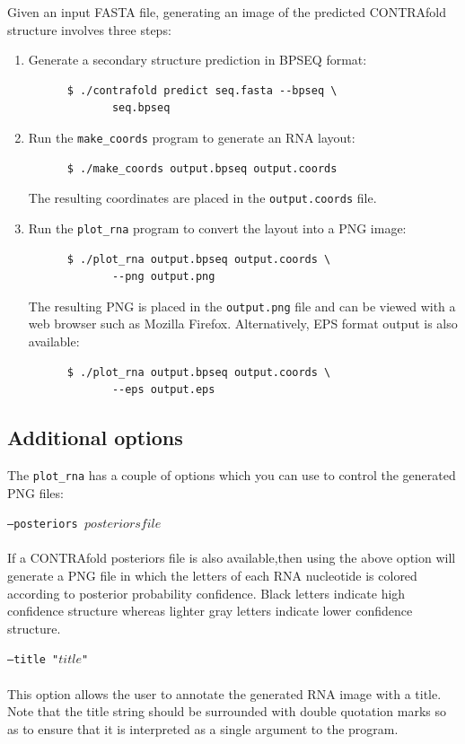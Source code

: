 \documentclass{article}
\begin{document}
  Given an input FASTA file, generating an image of the predicted
  CONTRAfold structure involves three steps:
  \begin{enumerate}
  \item 
    Generate a secondary structure prediction in BPSEQ format:
    \begin{verbatim}
      $ ./contrafold predict seq.fasta --bpseq \
             seq.bpseq\end{verbatim}
  \item
    Run the \texttt{make\_coords} program to generate an RNA layout:
    \begin{verbatim}
      $ ./make_coords output.bpseq output.coords\end{verbatim}
    The resulting coordinates are placed in the \texttt{output.coords}
    file.  
  \item
    Run the \texttt{plot\_rna} program to convert the 
    layout into a PNG image:
    \begin{verbatim}
      $ ./plot_rna output.bpseq output.coords \
             --png output.png\end{verbatim}
    The resulting PNG is placed in the \texttt{output.png} file and
    can be viewed with a web browser such as Mozilla Firefox.
    Alternatively, EPS format output is also available:
    \begin{verbatim}
      $ ./plot_rna output.bpseq output.coords \
             --eps output.eps\end{verbatim}
  \end{enumerate}
  
  \subsection{Additional options}
  
  The \texttt{plot\_rna} has a couple of options which you can
  use to control the generated PNG files:
  \begin{description}
    \item \texttt{--posteriors $posteriorsfile$} \\
      \\
      If a CONTRAfold posteriors file is also available,then
      using the above option will generate a PNG file in which
      the letters of each RNA nucleotide is colored according
      to posterior probability confidence.  Black letters indicate
      high confidence structure whereas lighter gray letters indicate
      lower confidence structure.
    \item \texttt{--title "$title$"} \\
      \\
      This option allows the user to annotate the generated
      RNA image with a title.  Note that the title string should
      be surrounded with double quotation marks so as to ensure
      that it is interpreted as a single argument to the program.
  \end{description}
\end{document}
